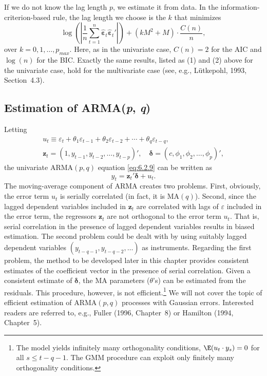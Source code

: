 If we do not know the lag length $p$, we estimate it from data. In the information-criterion-based
rule, the lag length we choose is the $k$ that minimizes
\begin{equation}
  \log\left(\left|\frac{1}{n} \sum_{t=1}^{n} \hat{\bm{\varepsilon}}_t \hat{\bm{\varepsilon}}_t'\right|\right)
  + (k M^2 + M) \cdot \frac{C(n)}{n},
  \label{eq:6.4.12}
\end{equation}
over $k = 0, 1, \ldots, p_{max}$. Here, as in the univariate case, $C(n) = 2$ for the AIC and
$\log(n)$ for the BIC. Exactly the same results, listed as (1) and (2) above for the univariate
case, hold for the multivariate case (see, e.g., L\"utkepohl, 1993, Section~4.3).

\subsection*{Estimation of ARMA(\textit{p}, \textit{q})}

Letting
\begin{gather*}
  u_t \equiv \varepsilon_t + \theta_1 \varepsilon_{t-1} + \theta_2 \varepsilon_{t-2} + \cdots + \theta_q \varepsilon_{t-q}, \\
  \mathbf{z}_t = (1, y_{t-1}, y_{t-2}, \ldots, y_{t-p})', \quad
  \bm{\delta} = (c, \phi_1, \phi_2, \ldots, \phi_p)',
\end{gather*}
the univariate $\text{ARMA}(p, q)$ equation \eqref{eq:6.2.9} can be written as
\begin{equation}
  y_t = \mathbf{z}_t' \bm{\delta} + u_t.
  \label{eq:6.4.13}
\end{equation}
The moving-average component of ARMA creates two problems. First, obviously,
the error term $u_t$ is serially correlated (in fact, it is $\text{MA}(q)$). Second, since the
lagged dependent variables included in $\mathbf{z}_t$ are correlated with lags of $\varepsilon$ included in
the error term, the regressors $\mathbf{z}_t$ are not orthogonal to the error term $u_t$. That is,
serial correlation in the presence of lagged dependent variables results in biased
estimation. The second problem could be dealt with by using suitably lagged
dependent variables $(y_{t-q-1}, y_{t-q-2}, \ldots)$ as instruments. Regarding the first problem,
the method to be developed later in this chapter provides consistent estimates
of the coefficient vector in the presence of serial correlation. Given a consistent
estimate of $\bm{\delta}$, the MA parameters ($\theta$'s) can be estimated from the residuals. This
procedure, however, is not efficient.\footnote{The model yields infinitely many orthogonality conditions, $\E(u_t \cdot y_s) = 0$ for all $s \leq t - q - 1$. The GMM procedure can exploit only finitely many orthogonality conditions.}
We will not cover the topic of efficient estimation
of $\text{ARMA}(p, q)$ processes with Gaussian errors. Interested readers are
referred to, e.g., Fuller (1996, Chapter~8) or Hamilton (1994, Chapter~5).


